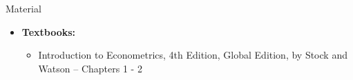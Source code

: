 \documentclass[notes,10pt, aspectratio=169]{beamer}
\begin{document}
\begin{frame}[allowframebreaks]{Material}
\begin{itemize}
    \item[--] \textbf{Textbooks:}
    \begin{itemize}
        \item Introduction to Econometrics, 4th Edition, Global Edition, by Stock and Watson -- Chapters 1 - 2
    \end{itemize}
\end{itemize}
\end{frame}
\end{document}

